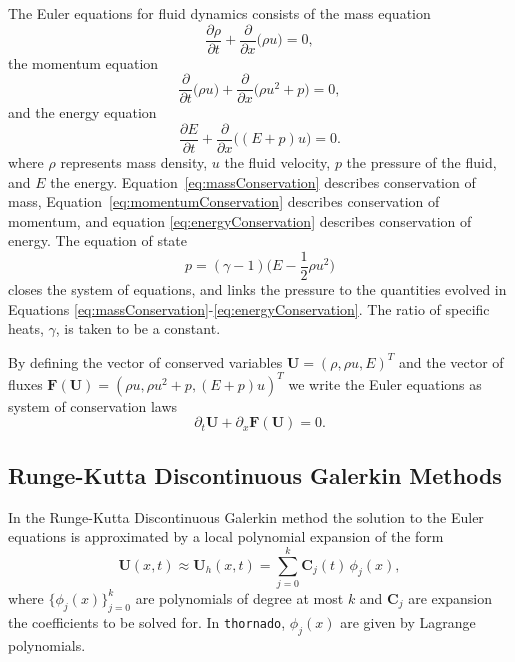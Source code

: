 \documentclass[10pt]{article}
\newcommand{\thornado}{\texttt{thornado}}
\begin{document}
The Euler equations for fluid dynamics \citep[see, e.g.,][for details]{Leveque2002} consists of the mass equation
\begin{equation}
  \frac{\partial \rho}{\partial t}  
  + \frac{\partial}{\partial x} \Big(\rho u\Big) = 0,
  \label{eq:massConservation}
\end{equation}
the momentum equation
\begin{equation}
  \frac{\partial}{\partial t} \Big(\rho u\Big)
  + \frac{\partial}{\partial x} \Big(\rho u^2 + p\Big) = 0,
  \label{eq:momentumConservation}
\end{equation}
and the energy equation
\begin{equation}
  \frac{\partial E}{\partial t}
  + \frac{\partial}{\partial x} \Big((E + p) u\Big) = 0.  
  \label{eq:energyConservation}
\end{equation}
where $\rho$ represents mass density, $u$ the fluid velocity, $p$ the pressure of the fluid, and $E$ the energy.  
Equation~\eqref{eq:massConservation} describes conservation of mass, Equation~\eqref{eq:momentumConservation} describes conservation of momentum, and equation \eqref{eq:energyConservation} describes conservation of energy.
The equation of state
\begin{equation}
  p = (\gamma - 1)
  \Big(E - \frac{1}{2} \rho u^2 \Big)
  \label{eq:eos}
\end{equation}
closes the system of equations, and links the pressure to the quantities evolved in Equations \eqref{eq:massConservation}-\eqref{eq:energyConservation}. 
The ratio of specific heats, $\gamma$, is taken to be a constant.  

By defining the vector of conserved variables $\boldsymbol{U}=(\rho,\rho u,E)^{T}$ and the vector of fluxes $\boldsymbol{F}(\boldsymbol{U})=(\rho u,\rho u^{2}+p,(E+p)u)^{T}$ we write the Euler equations as system of conservation laws
\begin{equation}
  \partial_{t}\boldsymbol{U}
  +\partial_{x}\boldsymbol{F}(\boldsymbol{U})
  =0.
\end{equation}

\subsection{Runge-Kutta Discontinuous Galerkin Methods}

In the Runge-Kutta Discontinuous Galerkin \citep[RKDG; cf.][]{cockburnShu_2001} method the solution to the Euler equations is approximated by a local polynomial expansion of the form
\begin{equation}
  \boldsymbol{U}(x,t)
  \approx\boldsymbol{U}_{h}(x,t)=\sum_{j=0}^{k}\boldsymbol{C}_{j}(t)\,\phi_{j}(x),
\end{equation}
where $\{\phi_{j}(x)\}_{j=0}^{k}$ are polynomials of degree at most $k$ and $\boldsymbol{C}_{j}$ are expansion the coefficients to be solved for.  
In \thornado, $\phi_{j}(x)$ are given by Lagrange polynomials.  
\end{document}
